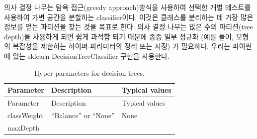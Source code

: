 \documentclass[11pt]{book}
\theoremstyle{definition}
\theoremstyle{definition}
\theoremstyle{definition}
\theoremstyle{remark}
\begin{document}
의사 결정 나무는 탐욕 접근(greedy approach)방식을 사용하여 선택한 개별
테스트를 사용하여 가변 공간을 분할하는 classifier이다. 이것은 클래스를
분리하는 데 가장 많은 정보를 얻는 파티션을 찾는 것을 목표로 한다. 의사
결정 나무는 많은 수의 파티션(tree depth)을 사용하게 되면 쉽게 과적합
되기 때문에 종종 일부 정규화 (예를 들어, 모형의 복잡성을 제한하는
하이퍼-파라미터의 정리 또는 지정) 가 필요하다. 우리는 파이썬에 있는
sklearn DecisionTreeClassifier 구현을 사용한다. 

\begin{longtable}[]{@{}lll@{}}
\caption{\label{tab:decisionTreeParameters} Hyper-parameters for decision
trees.}\tabularnewline
\toprule
\begin{minipage}[b]{0.13\columnwidth}\raggedright\strut
Parameter\strut
\end{minipage} & \begin{minipage}[b]{0.16\columnwidth}\raggedright\strut
Description\strut
\end{minipage} & \begin{minipage}[b]{0.20\columnwidth}\raggedright\strut
Typical values\strut
\end{minipage}\tabularnewline
\midrule
\endfirsthead
\toprule
\begin{minipage}[b]{0.13\columnwidth}\raggedright\strut
Parameter\strut
\end{minipage} & \begin{minipage}[b]{0.16\columnwidth}\raggedright\strut
Description\strut
\end{minipage} & \begin{minipage}[b]{0.20\columnwidth}\raggedright\strut
Typical values\strut
\end{minipage}\tabularnewline
\midrule
\endhead
\begin{minipage}[t]{0.13\columnwidth}\raggedright\strut
classWeight\strut
\end{minipage} & \begin{minipage}[t]{0.16\columnwidth}\raggedright\strut
``Balance'' or ``None''\strut
\end{minipage} & \begin{minipage}[t]{0.20\columnwidth}\raggedright\strut
None\strut
\end{minipage}\tabularnewline
\begin{minipage}[t]{0.13\columnwidth}\raggedright\strut
maxDepth\strut
\end{minipage} & \begin{minipage}[t]{0.16\columnwidth}\raggedright\strut

\end{minipage}
\end{longtable}
\end{document}
